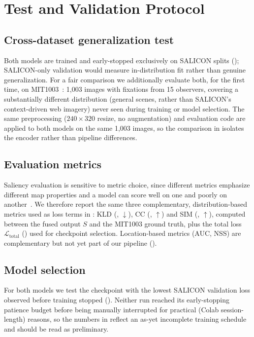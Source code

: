 
\section{Test and Validation Protocol}
\label{sec:validation}

\subsection{Cross-dataset generalization test}
\label{subsec:crossdataset}

Both models are trained and early-stopped exclusively on SALICON splits (); SALICON-only validation would measure in-distribution fit rather than genuine generalization. For a fair comparison we additionally evaluate both, for the first time, on MIT1003~\cite{judd2009learning}: 1{,}003 images with fixations from 15 observers, covering a substantially different distribution (general scenes, rather than SALICON's context-driven web imagery) never seen during training or model selection. The same preprocessing ($240\times320$ resize, no augmentation) and evaluation code are applied to both models on the same 1{,}003 images, so the comparison in  isolates the encoder rather than pipeline differences.

\subsection{Evaluation metrics}
\label{subsec:metrics}

Saliency evaluation is sensitive to metric choice, since different metrics emphasize different map properties and a model can score well on one and poorly on another~\cite{bylinskii2019different}. We therefore report the same three complementary, distribution-based metrics used as loss terms in : KLD (, $\downarrow$), CC (, $\uparrow$) and SIM (, $\uparrow$), computed between the fused output $S$ and the MIT1003 ground truth, plus the total loss $\mathcal{L}_{\mathrm{total}}$ () used for checkpoint selection. Location-based metrics (AUC, NSS) are complementary but not yet part of our pipeline ().

\subsection{Model selection}
\label{subsec:selection}

For both models we test the checkpoint with the lowest SALICON validation loss observed before training stopped (). Neither run reached its early-stopping patience budget before being manually interrupted for practical (Colab session-length) reasons, so the numbers in  reflect an as-yet incomplete training schedule and should be read as preliminary.
